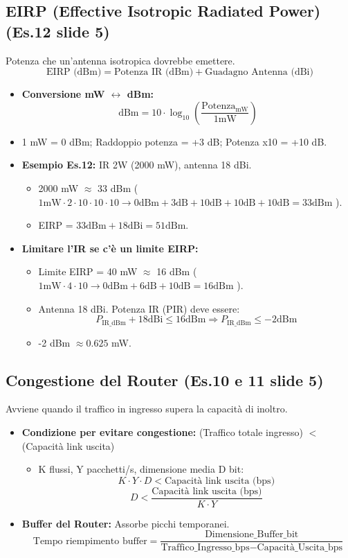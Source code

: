 \documentclass{article}
\begin{document}
\subsection{EIRP (Effective Isotropic Radiated Power) (Es.12 slide 5)}
Potenza che un'antenna isotropica dovrebbe emettere.
\[ \text{EIRP (dBm)} = \text{Potenza IR (dBm)} + \text{Guadagno Antenna (dBi)} \]
\begin{itemize}
    \item \textbf{Conversione mW $\leftrightarrow$ dBm:}
    \[ \text{dBm} = 10 \cdot \log_{10} \left( \frac{\text{Potenza}_{\text{mW}}}{1\text{mW}} \right) \]
    \item 1 mW = 0 dBm; Raddoppio potenza = +3 dB; Potenza x10 = +10 dB.
    \item \textbf{Esempio Es.12:} IR 2W (2000 mW), antenna 18 dBi.
    \begin{itemize}
        \item 2000 mW $\approx$ 33 dBm ( $1\text{mW} \cdot 2 \cdot 10 \cdot 10 \cdot 10 \rightarrow 0\text{dBm} + 3\text{dB} + 10\text{dB} + 10\text{dB} + 10\text{dB} = 33\text{dBm}$ ).
        \item EIRP = $33\text{dBm} + 18\text{dBi} = 51\text{dBm}$.
    \end{itemize}
    \item \textbf{Limitare l'IR se c'è un limite EIRP:}
    \begin{itemize}
        \item Limite EIRP = 40 mW $\approx$ 16 dBm ( $1\text{mW} \cdot 4 \cdot 10 \rightarrow 0\text{dBm} + 6\text{dB} + 10\text{dB} = 16\text{dBm}$ ).
        \item Antenna 18 dBi. Potenza IR (P\textunderscore IR) deve essere:
        \[ P_{\text{IR\_dBm}} + 18\text{dBi} \le 16\text{dBm} \Rightarrow P_{\text{IR\_dBm}} \le -2\text{dBm} \]
        \item -2 dBm $\approx 0.625$ mW.
    \end{itemize}
\end{itemize}

\subsection{Congestione del Router (Es.10 e 11 slide 5)}
Avviene quando il traffico in ingresso supera la capacità di inoltro.
\begin{itemize}
    \item \textbf{Condizione per evitare congestione:} (Traffico totale ingresso) $<$ (Capacità link uscita)
    \begin{itemize}
        \item K flussi, Y pacchetti/s, dimensione media D bit:
        \[ K \cdot Y \cdot D < \text{Capacità link uscita (bps)} \]
        \[ D < \frac{\text{Capacità link uscita (bps)}}{K \cdot Y} \]
    \end{itemize}
    \item \textbf{Buffer del Router:} Assorbe picchi temporanei.
    \[ \text{Tempo riempimento buffer} = \frac{\text{Dimensione\_Buffer\_bit}}{\text{Traffico\_Ingresso\_bps} - \text{Capacità\_Uscita\_bps}} \]
\end{itemize}
\end{document}
